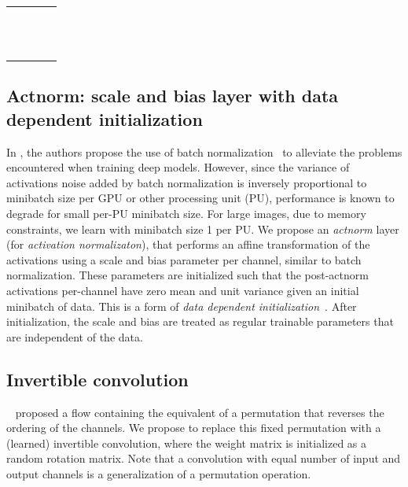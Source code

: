 \documentclass{article}
\begin{document}
\begin{table}
\begin{tabularx}{\textwidth}{ X | X | X | l}
\begin{tabular}[t]{@{}l@{}}
    \end{tabular}
    &
    \begin{tabular}[t]{@{}l@{}}
    \\
    \\
    \\
    \\
    \\
    
    \end{tabular}
    &
    
\\\bottomrule
  \end{tabularx}
\end{table}





\subsection{Actnorm: scale and bias layer with data dependent initialization}
\label{sec:actnorm}

In \cite{dinh2016density}, the authors propose the use of batch normalization~\citep{ioffe2015batch} to alleviate the problems encountered when training deep models. However, since the variance of activations noise added by batch normalization is inversely proportional to minibatch size per GPU or other processing unit (PU), performance is known to degrade for small per-PU minibatch size. For large images, due to memory constraints, we learn with minibatch size 1 per PU. We propose an \emph{actnorm} layer (for \emph{activation normalizaton}), that performs an affine transformation of the activations using a scale and bias parameter per channel, similar to batch normalization. These parameters are initialized such that the post-actnorm activations per-channel have zero mean and unit variance given an initial minibatch of data. This is a form of \emph{data dependent initialization}~\citep{salimans2016weight}. After initialization, the scale and bias are treated as regular trainable parameters that are independent of the data.

\subsection{Invertible  convolution}
\label{sec:invconv}

~\citep{dinh2014nice,dinh2016density} proposed a flow containing the equivalent of a permutation that reverses the ordering of the channels. We propose to replace this fixed permutation with a (learned) invertible  convolution, where the weight matrix is initialized as a random rotation matrix. Note that a  convolution with equal number of input and output channels is a generalization of a permutation operation.
\end{document}
